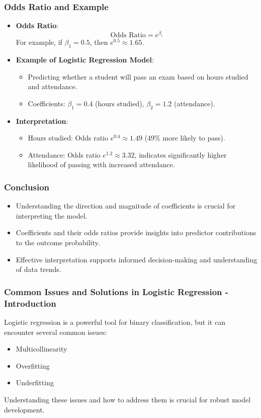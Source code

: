 \documentclass[aspectratio=169]{beamer}
\begin{document}
\begin{frame}[fragile]
    \frametitle{Odds Ratio and Example}
    \begin{itemize}
        \item \textbf{Odds Ratio}:
        \begin{equation}
            \text{Odds Ratio} = e^{\beta_i}
        \end{equation}
        For example, if \( \beta_1 = 0.5 \), then \( e^{0.5} \approx 1.65 \).
        \item \textbf{Example of Logistic Regression Model}:
        \begin{itemize}
            \item Predicting whether a student will pass an exam based on hours studied and attendance.
            \item Coefficients: \( \beta_1 = 0.4 \) (hours studied), \( \beta_2 = 1.2 \) (attendance).
        \end{itemize}
        \item \textbf{Interpretation}:
        \begin{itemize}
            \item Hours studied: Odds ratio \( e^{0.4} \approx 1.49 \) (49\% more likely to pass).
            \item Attendance: Odds ratio \( e^{1.2} \approx 3.32 \), indicates significantly higher likelihood of passing with increased attendance.
        \end{itemize}
    \end{itemize}
\end{frame}

\begin{frame}[fragile]
    \frametitle{Conclusion}
    \begin{itemize}
        \item Understanding the direction and magnitude of coefficients is crucial for interpreting the model.
        \item Coefficients and their odds ratios provide insights into predictor contributions to the outcome probability.
        \item Effective interpretation supports informed decision-making and understanding of data trends.
    \end{itemize}
\end{frame}

\begin{frame}[fragile]
    \frametitle{Common Issues and Solutions in Logistic Regression - Introduction}
    Logistic regression is a powerful tool for binary classification, but it can encounter several common issues:
    \begin{itemize}
        \item Multicollinearity
        \item Overfitting
        \item Underfitting
    \end{itemize}
    Understanding these issues and how to address them is crucial for robust model development.
\end{frame}
\end{document}
